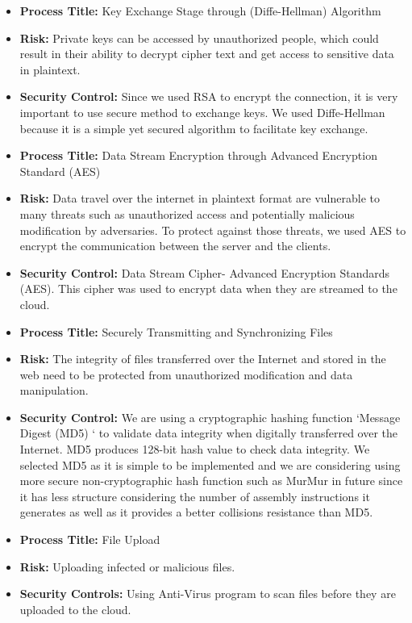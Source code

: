 \documentclass{article}
\begin{document}
\begin{enumerate}
\begin{itemize}
\item \textbf{Process Title:} Key Exchange Stage through (Diffe-Hellman) Algorithm
\item \textbf{Risk:} Private keys can be accessed by unauthorized people, which could result in their ability to decrypt cipher text and get access to sensitive data in plaintext.
\item \textbf{Security Control:} Since we used RSA to encrypt the connection, it is very important to use secure method to exchange keys. We used Diffe-Hellman because it is a simple yet secured algorithm to facilitate key exchange.

\item \textbf{Process Title:} Data Stream Encryption through Advanced Encryption Standard (AES)
\item \textbf{Risk:} Data travel over the internet in plaintext format are vulnerable to many threats such as unauthorized access and potentially malicious modification by adversaries. To protect against those threats, we used AES to encrypt the communication between the server and the clients.
\item \textbf{Security Control:} Data Stream Cipher- Advanced Encryption Standards (AES). This cipher was used to encrypt data when they are streamed to the cloud.

\item \textbf{Process Title:} Securely Transmitting and Synchronizing Files
\item \textbf{Risk:} The integrity of files transferred over the Internet and stored in the web need to be protected from unauthorized modification and data manipulation.
\item \textbf{Security Control:} We are using a cryptographic hashing function ‘Message Digest (MD5) ‘ to validate data integrity when digitally transferred over the Internet. MD5 produces 128-bit hash value to check data integrity. We selected MD5 as it is simple to be implemented and we are considering using more secure non-cryptographic hash function such as MurMur in future since it has less structure considering the number of assembly instructions it generates as well as it provides a better collisions resistance than MD5.

\item \textbf{Process Title:} File Upload
\item \textbf{Risk:} Uploading infected or malicious files.
\item \textbf{Security Controls:} Using Anti-Virus program to scan files before they are uploaded to the cloud.
\end{itemize}


\end{enumerate}
\end{document}
